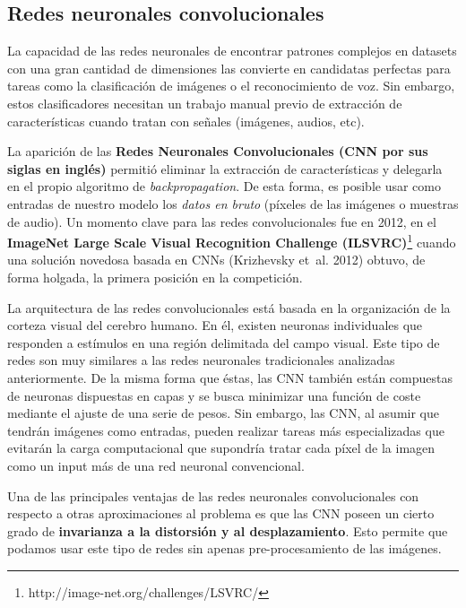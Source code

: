 \documentclass[
  12pt,
  spanish,
  a4paperpaper,
]{report}
\begin{document}
\hypertarget{redes-neuronales-convolucionales}{%
\subsection{Redes neuronales
convolucionales}\label{redes-neuronales-convolucionales}}

La capacidad de las redes neuronales de encontrar patrones complejos en
datasets con una gran cantidad de dimensiones las convierte en
candidatas perfectas para tareas como la clasificación de imágenes o el
reconocimiento de voz. Sin embargo, estos clasificadores necesitan un
trabajo manual previo de extracción de características cuando tratan con
señales (imágenes, audios, etc).

La aparición de las \textbf{Redes Neuronales Convolucionales (CNN por
sus siglas en inglés)} permitió eliminar la extracción de
características y delegarla en el propio algoritmo de
\emph{backpropagation}. De esta forma, es posible usar como entradas de
nuestro modelo los \emph{datos en bruto} (píxeles de las imágenes o
muestras de audio). Un momento clave para las redes convolucionales fue
en 2012, en el \textbf{ImageNet Large Scale Visual Recognition Challenge
(ILSVRC)}\footnote{http://image-net.org/challenges/LSVRC/} cuando una
solución novedosa basada en CNNs (Krizhevsky et~al. 2012) obtuvo, de
forma holgada, la primera posición en la competición.

La arquitectura de las redes convolucionales está basada en la
organización de la corteza visual del cerebro humano. En él, existen
neuronas individuales que responden a estímulos en una región delimitada
del campo visual. Este tipo de redes son muy similares a las redes
neuronales tradicionales analizadas anteriormente. De la misma forma que
éstas, las CNN también están compuestas de neuronas dispuestas en capas
y se busca minimizar una función de coste mediante el ajuste de una
serie de pesos. Sin embargo, las CNN, al asumir que tendrán imágenes
como entradas, pueden realizar tareas más especializadas que evitarán la
carga computacional que supondría tratar cada píxel de la imagen como un
input más de una red neuronal convencional.

Una de las principales ventajas de las redes neuronales convolucionales
con respecto a otras aproximaciones al problema es que las CNN poseen un
cierto grado de \textbf{invarianza a la distorsión y al desplazamiento}.
Esto permite que podamos usar este tipo de redes sin apenas
pre-procesamiento de las imágenes.
\end{document}
